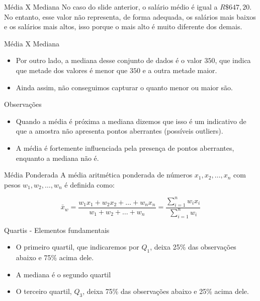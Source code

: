 \begin{frame}{Média X Mediana}
    No caso do slide anterior, o salário médio é igual a $R\$ 647,20$. No entanto, esse valor não representa, de forma adequada, os salários mais
    baixos e os salários mais altos, isso porque o mais alto é muito diferente dos demais.
     
\end{frame}

\begin{frame}{Média X Mediana}
    \begin{itemize}
        \item Por outro lado, a mediana desse conjunto de dados é o valor $350$, que indica que metade dos valores é menor que $350$ e a outra metade maior. 
        \item Ainda assim, não conseguimos capturar o quanto menor ou maior são. 
    \end{itemize}
\end{frame}

\begin{frame}{Observações}
\begin{itemize}
    \item Quando a média é próxima a mediana dizemos que isso é um indicativo de que a amostra não apresenta pontos aberrantes (possíveis outliers).
    \item A média é fortemente influenciada pela presença de pontos aberrantes, enquanto a mediana não é.
\end{itemize}
    
\end{frame}

\begin{frame}{Média Ponderada}
    A média aritmética ponderada de números $x_1, x_2, \dots, x_n$ com pesos
    $w_1, w_2, \dots, w_n$ é definida como:

    $$\bar{x}_w = \dfrac{w_1x_1 + w_2x_2 + \dots + w_nx_n }{w_1 +w_2 + \dots + w_n} = \dfrac{\sum_{i=1}^n w_i x_i}{\sum_{i=1}^n w_i}$$
\end{frame}

\begin{frame}{Quartis - Elementos fundamentais}
    \begin{itemize}
        \item O primeiro quartil, que indicaremos por $Q_1$, deixa 25\% das observações abaixo e 75\% acima dele. 
        \pause
        \item A mediana é o segundo quartil
        \pause
        \item O terceiro quartil, $Q_3$, deixa 75\% das observações abaixo e 25\% acima dele. 
    \end{itemize}
    
\end{frame}

